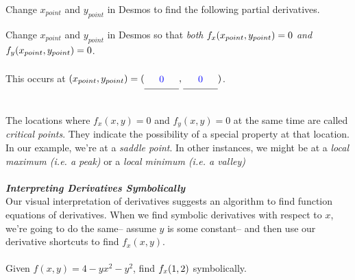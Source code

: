 \documentclass[11pt]{article}
\begin{document}
{\item Change $x_{point}$ and $y_{point}$ in Desmos to find  the following partial derivatives.

\item Change $x_{point}$ and $y_{point}$ in Desmos so that {\em both} $\displaystyle f_x(x_{point},y_{point})=0$ {\em and} $\displaystyle f_y(x_{point},y_{point})=0$.  \\\\
This occurs at $\ds (x_{point},y_{point})=(\unline{.5}{\blue{$0$}},\unline{.5}{\blue{$0$}})$.
}~\\
The locations where $f_x(x,y)=0$ and $f_y(x,y)=0$ at the same time are called {\em critical points}.  They indicate the possibility of  a special property at that location. In our example, we're at a {\em saddle point}. In other instances, we might be at a {\em local maximum (i.e. a peak)} or a {\em local minimum (i.e. a valley)}
~\\\\
{\bf \em Interpreting Derivatives Symbolically}\\
Our visual interpretation of derivatives suggests an algorithm to find function equations of derivatives.     When we find symbolic derivatives with respect to $x$, we're going to do the same-- assume $y$ is some constant-- and then use our derivative shortcuts to find $f_x(x,y)$.\\\\
\example Given $f(x,y)=4-yx^2-y^2$, find $\displaystyle f_x(1,2)$ symbolically.  
\end{document}
